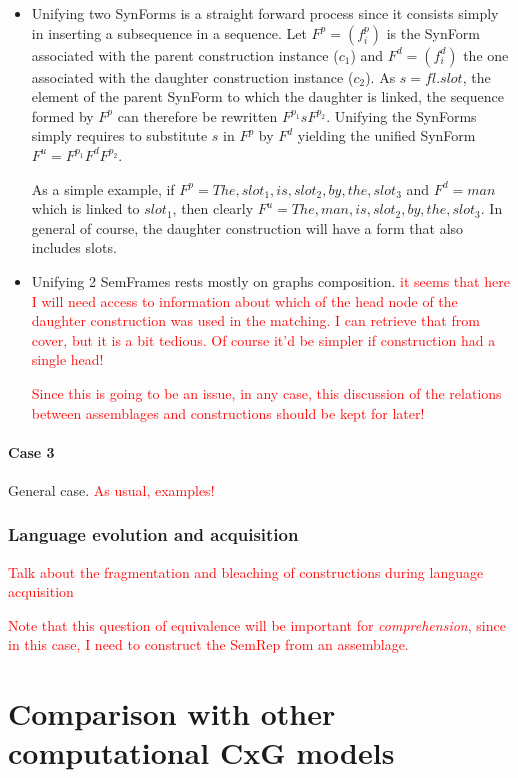 \documentclass{article}
\newcommand\todo[1]{\textcolor{red}{#1}}
\begin{document}
\begin{itemize}
\item Unifying two SynForms is a straight forward process since it consists simply in inserting a subsequence in a sequence. Let $ F^p = (f_i^p)$ is the SynForm associated with the parent construction instance ($c_1$) and $F^d = (f_i^d)$ the one associated with the daughter construction instance ($c_2$). As $s = fl.slot$, the element of the parent SynForm to which the daughter is linked, the sequence formed by $F^p$ can therefore be rewritten $F^{p_1}sF^{p_2}$. Unifying the SynForms simply requires to substitute $s$ in $F^p$ by $F^d$ yielding the unified SynForm $F^u = F^{p_1}F^dF^{p_2}$.

As a simple example, if $F^p = The, slot_1, is, slot_2, by,  the, slot_3$ and $F^d = man$ which is linked to $slot_1$, then clearly $F^u = The, man, is, slot_2, by, the, slot_3$. In general of course, the daughter construction will have a form that also includes slots.

\item Unifying 2 SemFrames rests mostly on graphs composition. 
\todo{it seems that here I will need access to information about which of the head node of the daughter construction was used in the matching. I can retrieve that from cover, but it is a bit tedious. Of course it'd be simpler if construction had a single head!}

\todo{Since this is going to be an issue, in any case, this discussion of the relations between assemblages and constructions should be kept for later!}
\end{itemize}

\paragraph{Case 3} 
General case.
\todo{As usual, examples!}

\subsubsection{Language evolution and acquisition}
\todo{Talk about the fragmentation and bleaching of constructions during language acquisition}

\todo{Note that this question of equivalence will be important for \emph{comprehension}, since in this case, I need to construct the SemRep from an assemblage.}

\section{Comparison with other computational CxG models}
\end{document}
